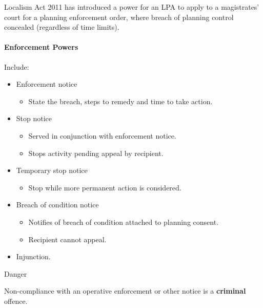 \documentclass[
]{article}
\providecommand{\tightlist}{%
  \setlength{\itemsep}{0pt}\setlength{\parskip}{0pt}}
\newenvironment{env-8a5e7adb-7713-4332-8aea-793ed113699a}
{
    \savenotes\tcolorbox[blanker,breakable,left=5pt,borderline west={2pt}{-4pt}{firebrick}]
}
{
    \endtcolorbox\spewnotes
}
\begin{document}
Localism Act 2011 has introduced a power for an LPA to apply to a
magistrates' court for a planning enforcement order, where breach of
planning control concealed (regardless of time limits).

\hypertarget{enforcement-powers}{%
\paragraph{Enforcement Powers}\label{enforcement-powers}}

Include:

\begin{itemize}
\tightlist
\item
  Enforcement notice

  \begin{itemize}
  \tightlist
  \item
    State the breach, steps to remedy and time to take action.
  \end{itemize}
\item
  Stop notice

  \begin{itemize}
  \tightlist
  \item
    Served in conjunction with enforcement notice.
  \item
    Stops activity pending appeal by recipient.
  \end{itemize}
\item
  Temporary stop notice

  \begin{itemize}
  \tightlist
  \item
    Stop while more permanent action is considered.
  \end{itemize}
\item
  Breach of condition notice

  \begin{itemize}
  \tightlist
  \item
    Notifies of breach of condition attached to planning consent.
  \item
    Recipient cannot appeal.
  \end{itemize}
\item
  Injunction.
\end{itemize}

\begin{env-8a5e7adb-7713-4332-8aea-793ed113699a}

Danger

Non-compliance with an operative enforcement or other notice is a
\textbf{criminal} offence.

\end{env-8a5e7adb-7713-4332-8aea-793ed113699a}
\end{document}
